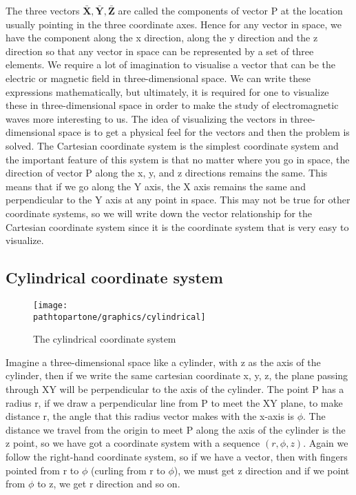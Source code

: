 The three vectors $\mathbf{\bar{X}, \bar{Y}, \bar{Z}}$ are called the components of vector P at the location usually pointing in the three coordinate axes. Hence for any vector in space, we have the component along the x direction, along the y direction and the z direction so that any vector in space can be represented by a set of three elements. We require a lot of imagination to visualise a vector that can be the electric or magnetic field in three-dimensional space. We can write these expressions mathematically, but ultimately, it is required for one to visualize these in three-dimensional space in order to make the study of electromagnetic waves more interesting to us. The idea of visualizing the vectors in three-dimensional space is to get a physical feel for the vectors and then the problem is solved. The Cartesian coordinate system is the simplest coordinate system and the important feature of this system is that no matter where you go in space, the direction of vector P along the x, y, and z directions remains the same. This means that if we go along the Y axis, the X axis remains the same and perpendicular to the Y axis at any point in space. This may not be true for other coordinate systems, so we will write down the vector relationship for the Cartesian coordinate system since it is the coordinate system that is very easy to visualize. 

\subsection{Cylindrical coordinate system}    
\begin{figure}[h]
\centering
\texttt{[image: \\pathtopartone/graphics/cylindrical]}
\caption{The cylindrical coordinate system}
\end{figure} 

Imagine a three-dimensional space like a cylinder, with z as the axis of the cylinder, then if we write the same cartesian coordinate x, y, z, the plane passing through XY will be perpendicular to the axis of the cylinder. The point P has a radius r, if we draw a perpendicular line from P to meet the XY plane, to make distance r, the angle that this radius vector makes with the x-axis is $\phi$. The distance we travel from the origin to meet P along the axis of the cylinder is the z point, so we have got a coordinate system with a sequence $( r, \phi, z)$. Again we follow the right-hand coordinate system, so if we have a vector, then with fingers pointed from r to $\phi $ (curling from r to $\phi$), we must get z direction and if we point from $\phi$ to z, we get r direction and so on.

